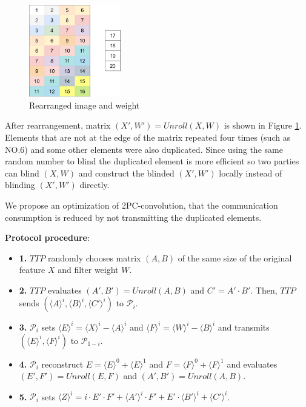 \documentclass[letterpaper]{article} %
\begin{document}
    \begin{figure}[htbp]
        \centering
        \includegraphics[width=4cm]{new_unrolling2.png}
        \caption{Rearranged image and weight}
        \label{rearrangement of image and weight}
    \end{figure}

    After rearrangement, matrix $(X',W')=Unroll(X,W)$
    is shown in Figure \ref{rearrangement of image and weight}.
    Elements that are not at the edge of the matrix repeated four times (such as NO.6)
    and some other elements were also duplicated.
    Since using the same random number to blind the duplicated element
    is more efficient so two parties can blind $(X,W)$ and
    construct the blinded $(X',W')$ locally instead of blinding $(X',W')$ directly.


    We propose an optimization of 2PC-convolution,
    that the communication consumption is reduced by
    not transmitting the duplicated elements.

    \textbf{Protocol procedure}:
    \begin{itemize}
        \item \textbf{1.} $TTP$ randomly chooses matrix $(A,B)$ of the same size of the original feature $X$ and filter weight $W$.
        \item \textbf{2.} $TTP$ evaluates $( A',B')=Unroll(A,B)$ and $C' =A'\cdot B' $.
        Then, $TTP$ sends $(\langle A\rangle ^{i},\langle B\rangle ^{i},\langle C'\rangle ^{i})$ to $\mathcal{P}_{i}$.
        \item \textbf{3.} $\mathcal{P}_{i}$ sets $\langle E\rangle ^{i}=\langle X\rangle ^{i}-\langle A\rangle ^{i}$
        and $\langle F\rangle ^{i}=\langle W\rangle ^{i}-\langle B\rangle ^{i}$
        and transmits $(\langle E\rangle ^{i},\langle F\rangle ^{i})$ to $\mathcal{P}_{1-i}$.
        \item \textbf{4.} $\mathcal{P}_{i}$ reconstruct $E = \langle E\rangle ^{0}+\langle E\rangle ^{1}$ and $F = \langle F\rangle ^{0}+\langle F\rangle ^{1}$
        and evaluates $(E',F')=Unroll(E,F)$ and $(A',B')=Unroll(A,B)$.
        \item \textbf{5.} $\mathcal{P}_{i}$ sets $\langle Z\rangle^{i}=i\cdot E' \cdot F' + \langle A'\rangle^{i} \cdot F' + E' \cdot \langle B'\rangle^{i} + \langle C'\rangle^{i}$.

    \end{itemize}
\end{document}
